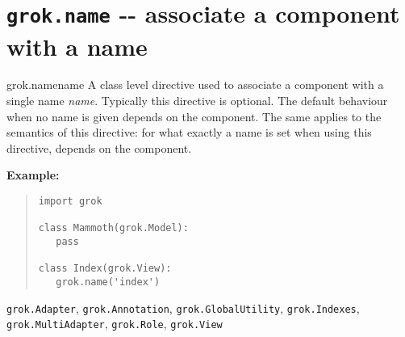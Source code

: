 \documentclass[10pt,a4paper,english]{manual}
\newcommand{\titlereference}[1]{\textsl{#1}}
\begin{document}

\section{\texttt{grok.name} -{}- associate a component with a name}
\begin{funcdesc}{grok.name}{name}
A class level directive used to associate a component with a single
name \titlereference{name}. Typically this directive is optional. The default behaviour
when no name is given depends on the component. The same applies to
the semantics of this directive: for what exactly a name is set
when using this directive, depends on the component.

\textbf{Example:}
\begin{quote}\begin{verbatim}
import grok

class Mammoth(grok.Model):
   pass

class Index(grok.View):
   grok.name('index')
\end{verbatim}\end{quote}
\begin{seealso}

\texttt{grok.Adapter}, \texttt{grok.Annotation},
\texttt{grok.GlobalUtility}, \texttt{grok.Indexes},
\texttt{grok.MultiAdapter}, \texttt{grok.Role},
\texttt{grok.View}
\end{seealso}

\end{funcdesc}


\end{document}
